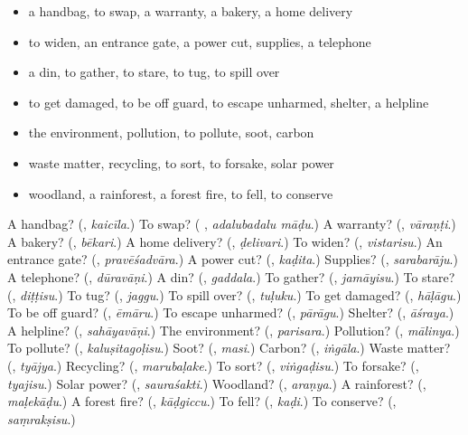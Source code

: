 \begin{itemize}
\raggedright
  \item a handbag, to swap, a warranty, a bakery, a home delivery
  \item to widen, an entrance gate, a power cut, supplies, a telephone
  \item a din, to gather, to stare, to tug, to spill over
  \item to get damaged, to be off guard, to escape unharmed, shelter, a helpline
  \item the environment, pollution, to pollute, soot, carbon
  \item waste matter, recycling, to sort, to forsake, solar power
  \item woodland, a rainforest, a forest fire, to fell, to conserve
\end{itemize}

\begin{tcolorbox}[breakable,colback=teal!4,colframe=teal!35!black,title={Before you move on}]
A handbag? (\textbf{}, \emph{kaicīla}.) To swap? (\textbf{ }, \emph{adalubadalu māḍu}.) A warranty? (\textbf{}, \emph{vāraṇṭi}.) A bakery? (\textbf{}, \emph{bēkari}.) A home delivery? (\textbf{}, \emph{ḍelivari}.) To widen? (\textbf{}, \emph{vistarisu}.) An entrance gate? (\textbf{}, \emph{pravēśadvāra}.) A power cut? (\textbf{}, \emph{kaḍita}.) Supplies? (\textbf{}, \emph{sarabarāju}.) A telephone? (\textbf{}, \emph{dūravāṇi}.) A din? (\textbf{}, \emph{gaddala}.) To gather? (\textbf{}, \emph{jamāyisu}.) To stare? (\textbf{}, \emph{diṭṭisu}.) To tug? (\textbf{}, \emph{jaggu}.) To spill over? (\textbf{}, \emph{tuḷuku}.) To get damaged? (\textbf{}, \emph{hāḷāgu}.) To be off guard? (\textbf{}, \emph{ēmāru}.) To escape unharmed? (\textbf{}, \emph{pārāgu}.) Shelter? (\textbf{}, \emph{āśraya}.) A helpline? (\textbf{}, \emph{sahāyavāṇi}.) The environment? (\textbf{}, \emph{parisara}.) Pollution? (\textbf{}, \emph{mālinya}.) To pollute? (\textbf{}, \emph{kaluṣitagoḷisu}.) Soot? (\textbf{}, \emph{masi}.) Carbon? (\textbf{}, \emph{iṅgāla}.) Waste matter? (\textbf{}, \emph{tyājya}.) Recycling? (\textbf{}, \emph{marubaḷake}.) To sort? (\textbf{}, \emph{viṅgaḍisu}.) To forsake? (\textbf{}, \emph{tyajisu}.) Solar power? (\textbf{}, \emph{sauraśakti}.) Woodland? (\textbf{}, \emph{araṇya}.) A rainforest? (\textbf{}, \emph{maḷekāḍu}.) A forest fire? (\textbf{}, \emph{kāḍgiccu}.) To fell? (\textbf{}, \emph{kaḍi}.) To conserve? (\textbf{}, \emph{saṃrakṣisu}.)
\end{tcolorbox}
